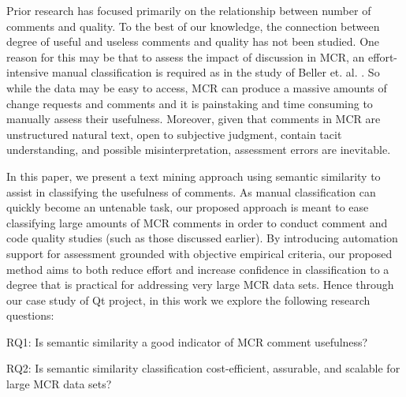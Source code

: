 Prior research has focused primarily on the relationship between number of comments and quality.
To the best of our knowledge, the connection between degree of useful and useless comments and quality has not been studied.
One reason for this may be that to assess the impact of discussion in MCR, an effort-intensive manual classification is required as in the study of Beller et. al. \cite{Beller}.
So while the data may be easy to access, MCR can produce a massive amounts of change requests and comments\cite{Balachandran2013,Thongtanunam2014} and it is painstaking and time consuming to manually assess their usefulness.
Moreover, given that comments in MCR are unstructured natural text, open to subjective judgment, contain tacit understanding, and possible misinterpretation, assessment errors are inevitable. 







In this paper, we present a text mining approach using semantic similarity to assist in classifying the usefulness of comments.
As manual classification can quickly become an untenable task, our proposed approach is meant to ease classifying large amounts of MCR comments in order to conduct comment and code quality studies (such as those discussed earlier).
By introducing automation support for assessment grounded with objective empirical criteria, our proposed method aims to both reduce effort and increase confidence in classification to a degree that is practical for addressing very large MCR data sets.
Hence through our case study of Qt project, in this work we explore the following research questions:
\begin{ResearchQuestions}
\item[RQ1:] Is semantic similarity a good indicator of MCR comment usefulness?\\
\item[RQ2:] Is semantic similarity classification cost-efficient, assurable, and scalable for large MCR data sets?
\end{ResearchQuestions}

